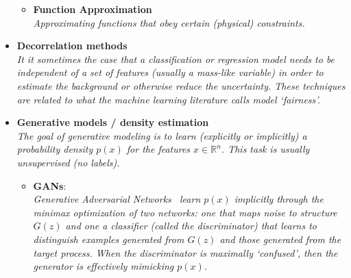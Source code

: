 \documentclass[12pt,letterpaper]{article}
\begin{document}
\begin{itemize}
\begin{itemize}
		\item \textbf{Function Approximation}~\cite{1853982}
		\\\textit{Approximating functions that obey certain (physical) constraints.}
	\end{itemize}
\item \textbf{Decorrelation methods}~\cite{Louppe:2016ylz,Dolen:2016kst,Moult:2017okx,Stevens:2013dya,Shimmin:2017mfk,Bradshaw:2019ipy,ATL-PHYS-PUB-2018-014,DiscoFever,Xia:2018kgd,Englert:2018cfo,Wunsch:2019qbo,Rogozhnikov:2014zea,10.1088/2632-2153/ab9023,clavijo2020adversarial,Kasieczka:2020pil,Kitouni:2020xgb}
\\\textit{It it sometimes the case that a classification or regression model needs to be independent of a set of features (usually a mass-like variable) in order to estimate the background or otherwise reduce the uncertainty.  These techniques are related to what the machine learning literature calls model `fairness'.}
\item \textbf{Generative models / density estimation}
\\\textit{The goal of generative modeling is to learn (explicitly or implicitly) a probability density $p(x)$ for the features $x\in\mathbb{R}^n$.  This task is usually unsupervised (no labels).}
	\begin{itemize}
		\item \textbf{GANs}:~\cite{deOliveira:2017pjk,Paganini:2017hrr,Paganini:2017dwg,Alonso-Monsalve:2018aqs,Butter:2019eyo,Martinez:2019jlu,Bellagente:2019uyp,Vallecorsa:2019ked,SHiP:2019gcl,Carrazza:2019cnt,Butter:2019cae,Lin:2019htn,DiSipio:2019imz,Hashemi:2019fkn,Chekalina:2018hxi,ATL-SOFT-PUB-2018-001,Zhou:2018ill,Carminati:2018khv,Vallecorsa:2018zco,Datta:2018mwd,Musella:2018rdi,Erdmann:2018kuh,Deja:2019vcv,Derkach:2019qfk,Erbin:2018csv,Erdmann:2018jxd,Urban:2018tqv,Oliveira:DLPS2017,deOliveira:2017rwa,Farrell:2019fsm,Hooberman:DLPS2017,Belayneh:2019vyx,buhmann2020getting,Alanazi:2020jod,2009.03796,2008.06545,Kansal:2020svm,Maevskiy:2020ank,Lai:2020byl,Choi:2021sku,Rehm:2021zow,Rehm:2021zoz,Carrazza:2021hny}
		\\\textit{Generative Adversarial Networks~\cite{Goodfellow:2014upx} learn $p(x)$ implicitly through the minimax optimization of two networks: one that maps noise to structure $G(z)$ and one a classifier (called the discriminator) that learns to distinguish examples generated from $G(z)$ and those generated from the target process.  When the discriminator is maximally `confused', then the generator is effectively mimicking $p(x)$.}

\end{itemize}
\end{itemize}
\end{document}
